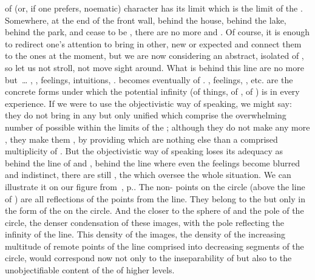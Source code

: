  of  (or, if one prefers, noematic) character
has its limit which is the limit of the \hoa. Somewhere, at the end of the front
wall, behind the house, behind the lake, behind the park,  and
 cease to be , there are no more  and
. Of course, it is enough to redirect one's attention to bring in
other, new or expected  and connect them to the ones  at
the moment, but we are now considering an abstract, isolated  of
, so let us not stroll, not move sight around.
What is  behind this line are no more  but~\ldots
{}, , feelings, intuitions, .
 becomes eventually  of .
, feelings, , etc. are the concrete forms under which
the potential infinity (of things, of , of ) is
 in every experience.  If we were to use the objectivistic 
way of speaking, we might say: they do not bring in any  but only
unified  which comprise the overwhelming number of possible
 within the limits of the \hoa; although they do not make any
more  ,
they make them , by providing  which are nothing
else than a comprised multiplicity of .  But the objectivistic way
of speaking loses its adequacy as behind the line of  and
, behind the line where even the  feelings become
blurred and indistinct, there are still , the 
which oversee the whole  situation.
We can illustrate it on our figure from~, p.\pageref{fig:levels}.
The non- points on the circle (above the line of ) are
all reflections of the  points from the line. They belong to the
 but only in the form of the  on the circle. And
the closer to the sphere of  and the pole of the circle, the
denser condensation of these images, with the pole reflecting the infinity of
the line. This density of the images, the density of the increasing multitude of
remote points of the line comprised into decreasing segments of the circle,
would correspond now not only to the inseparability of  but also
to the unobjectifiable content of the  of higher levels.


